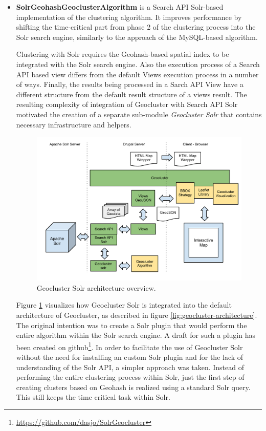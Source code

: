 \begin{itemize}
\item \textbf{SolrGeohashGeoclusterAlgorithm} is a Search API Solr-based implementation of the clustering algorithm. It improves performance by shifting the time-critical part from phase 2 of the clustering process into the Solr search engine, similarly to the approach of the MySQL-based algorithm. 

Clustering with Solr requires the Geohash-based spatial index to be integrated with the Solr search engine. Also the execution process of a Search API based view differs from the default Views execution process in a number of ways. Finally, the results being processed in a Sarch API View have a different structure from the default result structure of a views result. The resulting complexity of integration of Geocluster with Search API Solr motivated the creation of a separate sub-module \textit{Geocluster Solr} that contains necessary infrastructure and helpers.

\begin{figure}[h]
  \begin{center}
    \includegraphics[width=1\textwidth]{figures/geocluster_solr_architecture.pdf}
    \caption{Geocluster Solr architecture overview.}
    \label{fig:geocluster-solr-architecture}
  \end{center}
\end{figure}

Figure \ref{fig:geocluster-solr-architecture} visualizes how Geocluster Solr is integrated into the default architecture of Geocluster, as described in figure \ref{fig:geocluster-architecture}. The original intention was to create a Solr plugin that would perform the entire algorithm within the Solr search engine. A draft for such a plugin has been created on github\footnote{\url{https://github.com/dasjo/SolrGeocluster}}. In order to facilitate the use of Geocluster Solr without the need for installing an custom Solr plugin and for the lack of understanding of the Solr API, a simpler approach was taken. Instead of performing the entire clustering process within Solr, just the first step of creating clusters based on Geohash is realized using a standard Solr query. This still keeps the time critical task within Solr.


\end{itemize}
